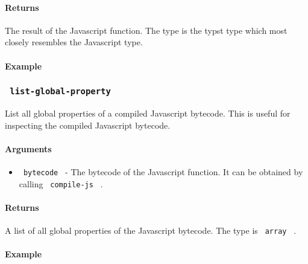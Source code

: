 \paragraph{Returns}\label{returns-2}

The result of the Javascript function. The type is the typst type which
most closely resembles the Javascript type.

\paragraph{Example}\label{example-3}

\begin{Shaded}
\begin{Highlighting}[]
\end{Highlighting}
\end{Shaded}

\subsubsection{\texorpdfstring{\texttt{\ list-global-property\ }}{ list-global-property }}\label{list-global-property}

List all global properties of a compiled Javascript bytecode. This is
useful for inspecting the compiled Javascript bytecode.

\paragraph{Arguments}\label{arguments-3}

\begin{itemize}
\tightlist
\item
  \texttt{\ bytecode\ } - The bytecode of the Javascript function. It
  can be obtained by calling \texttt{\ compile-js\ } .
\end{itemize}

\paragraph{Returns}\label{returns-3}

A list of all global properties of the Javascript bytecode. The type is
\texttt{\ array\ } .

\paragraph{Example}\label{example-4}

